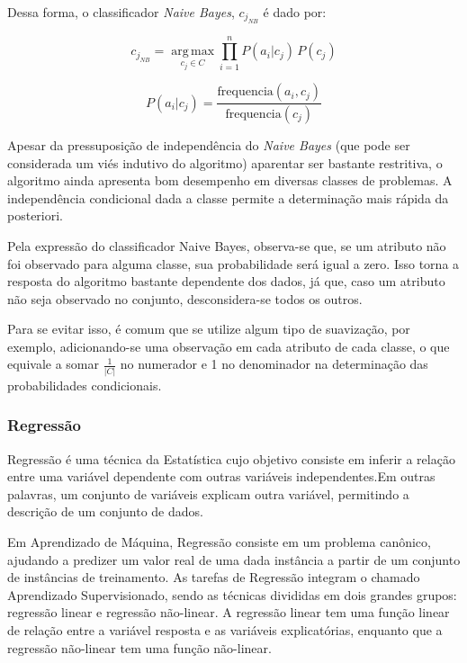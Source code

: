 \documentclass{article}
\begin{document}
Dessa forma, o classificador {\it Naive Bayes}, $c_{j_{NB}}$ é dado por:

\begin{equation}
c_{j_{NB}} = \operatorname*{arg\,max}_{c_j \in C} \prod_{i=1}^n P(a_i|c_j) \, P(c_j)
\end{equation}

\begin{equation}
P(a_i|c_j) = \frac{\mathrm{frequencia}(a_i,c_j)}{\mathrm{frequencia}(c_j)}
\end{equation}

Apesar da pressuposição de independência do {\it Naive Bayes}
(que pode ser considerada um viés indutivo do algoritmo) aparentar ser bastante restritiva,
o algoritmo ainda apresenta bom desempenho em diversas classes de problemas.
A independência condicional dada a classe permite a determinação mais rápida da posteriori.

Pela expressão do classificador Naive Bayes, observa-se que,
se um atributo não foi observado para alguma classe, sua probabilidade será igual a zero.
Isso torna a resposta do algoritmo bastante dependente dos dados,
já que, caso um atributo não seja observado no conjunto, desconsidera-se todos os outros.

Para se evitar isso, é comum que se utilize algum tipo de suavização, por exemplo,
adicionando-se uma observação em cada atributo de cada classe,
o que equivale a somar $\frac{1}{|C|}$ no numerador e 1 no denominador na determinação das probabilidades condicionais.

\subsubsection{Regressão}

Regressão é uma técnica da Estatística cujo objetivo consiste em inferir a relação entre uma variável dependente com outras variáveis independentes.Em outras palavras, um conjunto de variáveis explicam outra variável, permitindo a descrição de um conjunto de dados.

Em Aprendizado de Máquina, Regressão consiste em um problema canônico, ajudando a predizer um valor real de uma dada instância a partir de um conjunto de instâncias de treinamento. As tarefas de Regressão integram o chamado Aprendizado Supervisionado, sendo as técnicas divididas em dois grandes grupos: regressão linear e regressão não-linear. A regressão linear tem uma função linear de relação entre a variável resposta e as variáveis explicatórias, enquanto que a regressão não-linear tem uma função não-linear.
\end{document}
